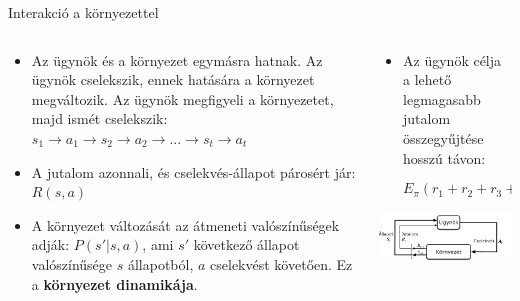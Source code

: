\documentclass[english, aspectratio=169]{beamer}
\begin{document}
\begin{frame}{Interakció a környezettel}
\begin{columns}
\begin{column}{.5\textwidth}
\begin{itemize}
	\item Az ügynök és a környezet egymásra hatnak. Az ügynök cselekszik, ennek hatására a környezet megváltozik. Az ügynök megfigyeli a környezetet, majd ismét cselekszik:
	$s_1 \rightarrow a_1 \rightarrow s_2 \rightarrow a_2 \rightarrow ... \rightarrow s_t 			\rightarrow a_t$
	\item A jutalom azonnali, és cselekvés-állapot párosért jár: $R(s, a)$
	\item A környezet változását az átmeneti valószínűségek adják: $P(s'|s, a)$, ami $s'$ következő állapot valószínűsége $s$ állapotból, $a$ cselekvést követően. Ez a \textbf{környezet dinamikája}.
\end{itemize}
\end{column}
\begin{column}{.5\textwidth}
\begin{itemize}
	\item Az ügynök célja a lehető legmagasabb jutalom összegyűjtése hosszú távon: 
	\begin{block}{}
	\vspace{-0.2cm}
	\[
	E_{\pi}(r_{1}+r_{2}+r_{3}+...)\rightarrow{max}
	\]
	\end{block}		
\end{itemize}
\begin{center}
\includegraphics[width=7.5cm, keepaspectratio]{images/reinforcement_9.png}
\end{center}
\end{column}
\end{columns}
\end{frame}
\end{document}
